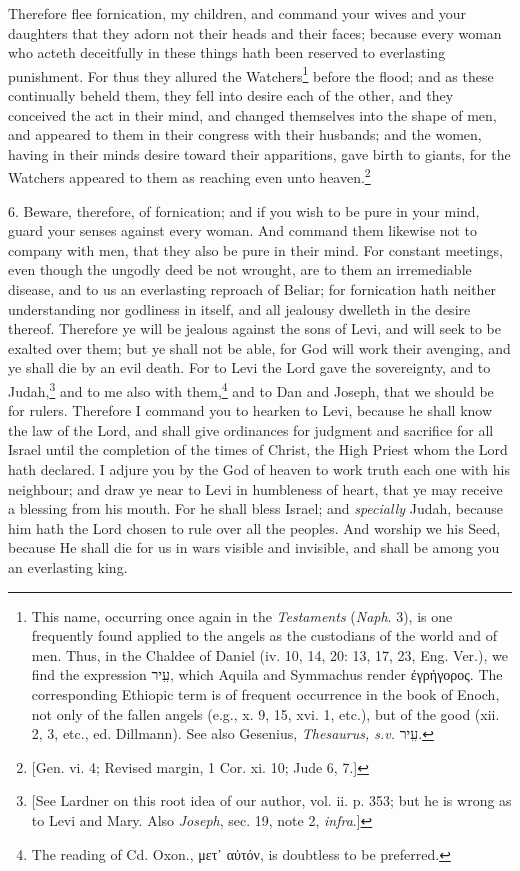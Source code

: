 Therefore flee fornication, my children, and command your wives and your daughters that they adorn not their heads and their faces; because every woman who acteth deceitfully in these things hath been reserved to everlasting punishment. For thus they allured the Watchers\footnote{This name, occurring once again in the \emph{Testaments} (\emph{Naph}. 3), is one frequently found applied to the angels as the custodians of the world and of men. Thus, in the Chaldee of Daniel (iv. 10, 14, 20: 13, 17, 23, Eng. Ver.), we find the expression \texthebrew{עִִיר}, which Aquila and Symmachus render \textgreek{ἐγρήγορος}. The corresponding Ethiopic term is of frequent occurrence in the book of Enoch, not only of the fallen angels (e.g., x. 9, 15, xvi. 1, etc.), but of the good (xii. 2, 3, etc., ed. Dillmann). See also Gesenius, \emph{Thesaurus, s.v.} \texthebrew{עִִיר}.} before the flood; and as these continually beheld them, they fell into desire each of the other, and they conceived the act in their mind, and changed themselves into the shape of men, and appeared to them in their congress with their husbands; and the women, having in their minds desire toward their apparitions, gave birth to giants, for the Watchers appeared to them as reaching even unto heaven.\footnote{[Gen. vi. 4; Revised margin, 1 Cor. xi. 10; Jude 6, 7.]}

6. Beware, therefore, of fornication; and if you wish to be pure in your mind, guard your senses against every woman. And command them likewise not to company with men, that they also be pure in their mind. For constant meetings, even though the ungodly deed be not wrought, are to them an irremediable disease, and to us an everlasting reproach of Beliar; for fornication hath neither understanding nor godliness in itself, and all jealousy dwelleth in the desire thereof. Therefore ye will be jealous against the sons of Levi, and will seek to be exalted over them; but ye shall not be able, for God will work their avenging, and ye shall die by an evil death. For to Levi the Lord gave the sovereignty, and to Judah,\footnote{[See Lardner on this root idea of our author, vol. ii. p. 353; but he is wrong as to Levi and Mary. Also \emph{Joseph}, sec. 19, note 2, \emph{infra}.]} and to me also with them,\footnote{The reading of Cd. Oxon., \textgreek{μετ᾽ αὐτόν}, is doubtless to be preferred.} and to Dan and Joseph, that we should be for rulers. Therefore I command you to hearken to Levi, because he shall know the law of the Lord, and shall give ordinances for judgment and sacrifice for all Israel until the completion of the times of Christ, the High Priest whom the Lord hath declared. I adjure you by the God of heaven to work truth each one with his neighbour; and draw ye near to Levi in humbleness of heart, that ye may receive a blessing from his mouth. For he shall bless Israel; and \emph{specially} Judah, because him hath the Lord chosen to rule over all the peoples. And worship we his Seed, because He shall die for us in wars visible and invisible, and shall be among you an everlasting king.


